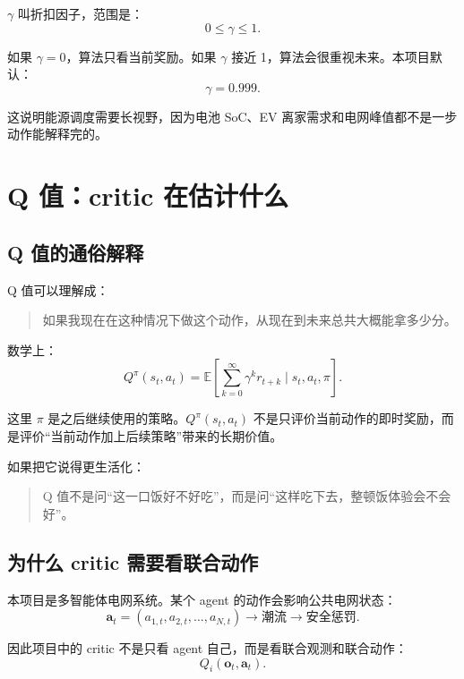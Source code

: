 \documentclass[UTF8,zihao=-4]{ctexart}
\begin{document}
$\gamma$ 叫折扣因子，范围是：
\begin{equation}
0\le \gamma\le 1.
\end{equation}

如果 $\gamma=0$，算法只看当前奖励。如果 $\gamma$ 接近 1，算法会很重视未来。本项目默认：
\begin{equation}
\gamma=0.999.
\end{equation}

这说明能源调度需要长视野，因为电池 SoC、EV 离家需求和电网峰值都不是一步动作能解释完的。

\section{Q 值：critic 在估计什么}

\subsection{Q 值的通俗解释}

Q 值可以理解成：
\begin{quote}
如果我现在在这种情况下做这个动作，从现在到未来总共大概能拿多少分。
\end{quote}

数学上：
\begin{equation}
Q^\pi(s_t,a_t)
=
\mathbb{E}
\left[
\sum_{k=0}^{\infty}\gamma^k r_{t+k}
\mid
s_t,a_t,\pi
\right].
\end{equation}

这里 $\pi$ 是之后继续使用的策略。$Q^\pi(s_t,a_t)$ 不是只评价当前动作的即时奖励，而是评价“当前动作加上后续策略”带来的长期价值。

如果把它说得更生活化：
\begin{quote}
Q 值不是问“这一口饭好不好吃”，而是问“这样吃下去，整顿饭体验会不会好”。
\end{quote}

\subsection{为什么 critic 需要看联合动作}

本项目是多智能体电网系统。某个 agent 的动作会影响公共电网状态：
\begin{equation}
\bm a_t=(a_{1,t},a_{2,t},\dots,a_{N,t})
\rightarrow
\text{潮流}
\rightarrow
\text{安全惩罚}.
\end{equation}

因此项目中的 critic 不是只看 agent 自己，而是看联合观测和联合动作：
\begin{equation}
Q_i(\bm{o}_t,\bm{a}_t).
\end{equation}
\end{document}
